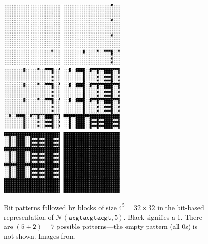 \begin{figure}[h]
	\centering
	\includegraphics[width=2.5in]{contents/00_images/0-1}\vspace*{5pt}
	\includegraphics[width=2.5in]{contents/00_images/2-3}\vspace*{5pt}
	\includegraphics[width=2.5in]{contents/00_images/4-5}
	
	\caption{Bit patterns followed by blocks of size $4^{5}=32\times32$ in the bit-based representation of $\mathcal{N}(\texttt{acgtacgtacgt},5)$. Black signifies a 1. There are $(5+2)=7$ possible patterns---the empty pattern (all 0s) is not shown. Images from \cite{sia2015}}
	\label{fig:bit_patterns}
\end{figure}